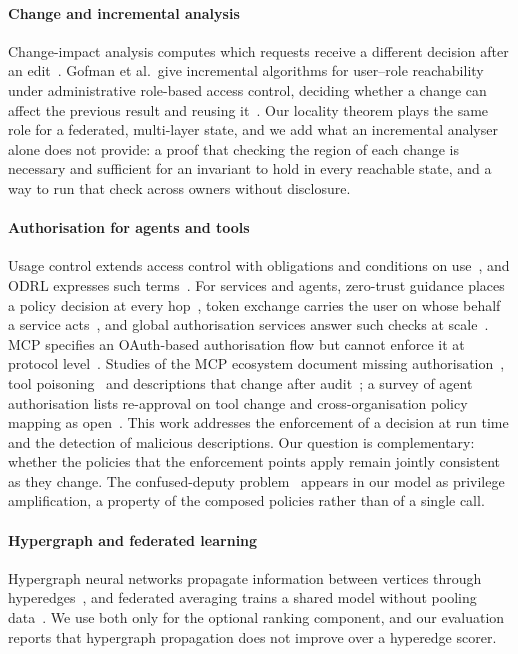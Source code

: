 \paragraph{Change and incremental analysis} Change-impact analysis computes which requests receive a different decision after an edit~\cite{fisler2005margrave}. Gofman et al.\ give incremental algorithms for user--role reachability under administrative role-based access control, deciding whether a change can affect the previous result and reusing it~\cite{gofman2010arbac}. Our locality theorem plays the same role for a federated, multi-layer state, and we add what an incremental analyser alone does not provide: a proof that checking the region of each change is necessary and sufficient for an invariant to hold in every reachable state, and a way to run that check across owners without disclosure.

\paragraph{Authorisation for agents and tools} Usage control extends access control with obligations and conditions on use~\cite{park2004ucon}, and ODRL expresses such terms~\cite{w3c2018odrl}. For services and agents, zero-trust guidance places a policy decision at every hop~\cite{nist800207a}, token exchange carries the user on whose behalf a service acts~\cite{rfc8693}, and global authorisation services answer such checks at scale~\cite{pang2019zanzibar}. MCP specifies an OAuth-based authorisation flow but cannot enforce it at protocol level~\cite{mcp2025spec,nsa2026mcp}. Studies of the MCP ecosystem document missing authorisation~\cite{hou2026mcp}, tool poisoning~\cite{wang2026mcptox} and descriptions that change after audit~\cite{bharti2026drift}; a survey of agent authorisation lists re-approval on tool change and cross-organisation policy mapping as open~\cite{surapani2026authz}. This work addresses the enforcement of a decision at run time and the detection of malicious descriptions. Our question is complementary: whether the policies that the enforcement points apply remain jointly consistent as they change. The confused-deputy problem~\cite{hardy1988deputy} appears in our model as privilege amplification, a property of the composed policies rather than of a single call.

\paragraph{Hypergraph and federated learning} Hypergraph neural networks propagate information between vertices through hyperedges~\cite{feng2019hgnn}, and federated averaging trains a shared model without pooling data~\cite{mcmahan2017fedavg}. We use both only for the optional ranking component, and our evaluation reports that hypergraph propagation does not improve over a hyperedge scorer.

